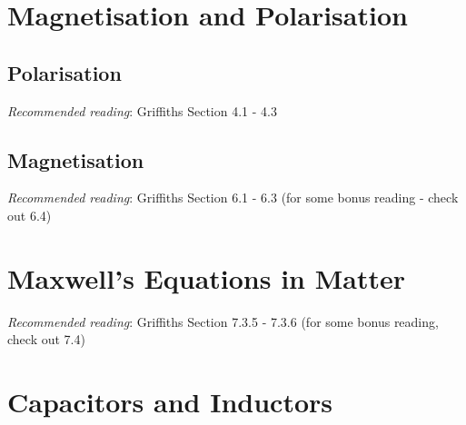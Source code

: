 \documentclass[
  letterpaper,
  DIV=11,
  numbers=noendperiod]{scrreprt}
\begin{document}

\chapter{Magnetisation and
Polarisation}\label{magnetisation-and-polarisation}

\newcommand{\l}{\mathrm{\mathbf{l}}}
\newcommand{\E}{\mathrm{\mathbf{E}}}
\newcommand{\F}{\mathrm{\mathbf{F}}}
\newcommand{\r}{\mathrm{\mathbf{r}}}

\newcommand{\x}{\mathrm{\mathbf{x}}}
\newcommand{\y}{\mathrm{\mathbf{y}}}
\newcommand{\z}{\mathrm{\mathbf{z}}}

\section{Polarisation}\label{polarisation}

\emph{Recommended reading}: Griffiths Section 4.1 - 4.3

\section{Magnetisation}\label{magnetisation}

\emph{Recommended reading}: Griffiths Section 6.1 - 6.3 (for some bonus
reading - check out 6.4)


\chapter{Maxwell's Equations in
Matter}\label{maxwells-equations-in-matter}

\newcommand{\l}{\mathrm{\mathbf{l}}}
\newcommand{\E}{\mathrm{\mathbf{E}}}
\newcommand{\F}{\mathrm{\mathbf{F}}}
\newcommand{\r}{\mathrm{\mathbf{r}}}

\newcommand{\x}{\mathrm{\mathbf{x}}}
\newcommand{\y}{\mathrm{\mathbf{y}}}
\newcommand{\z}{\mathrm{\mathbf{z}}}

\emph{Recommended reading}: Griffiths Section 7.3.5 - 7.3.6 (for some
bonus reading, check out 7.4)


\chapter{Capacitors and Inductors}\label{capacitors-and-inductors}

\newcommand{\l}{\mathrm{\mathbf{l}}}
\newcommand{\E}{\mathrm{\mathbf{E}}}
\newcommand{\F}{\mathrm{\mathbf{F}}}
\newcommand{\r}{\mathrm{\mathbf{r}}}
\end{document}
